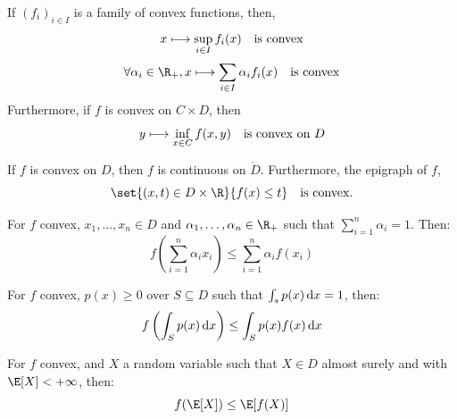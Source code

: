 \documentclass{../cs-classes/cs-classes}
\begin{document}
\begin{property}
    If $(f_i)_{i\in I}$ is a family of convex functions, then,
    \begin{equation*}
        x \longmapsto \sup_{i\in I} f_i(x) \quad\textnormal{is convex}
    \end{equation*}
    \begin{equation*}
        \forall \alpha_i\in\R_+, x \longmapsto \sum_{i\in I} \alpha_i f_i(x) \quad\textnormal{is convex}
    \end{equation*}
    Furthermore, if $f$ is convex on $C\times D$, then
    \begin{equation*}
        y \longmapsto \inf_{x\in C} f(x, y) \quad \textnormal{is convex on $D$}
    \end{equation*}
\end{property}

\begin{property}
    If $f$ is convex on $D$, then $f$ is continuous on $\mathring{D}$. Furthermore, the epigraph of $f$,
    \begin{equation*}
        \set{(x, t)\in D\times\R}{f(x)\leq t} \quad \textnormal{is convex.}
    \end{equation*}
\end{property}

\begin{property}
    For $f$ convex, $x_1, \dots, x_n\in D$ and $\alpha_1,\dots, \alpha_n\in\R_+$ such that $\sum_{i=1}^n\alpha_i=1$. Then:
    \begin{equation*}
        f\left(\sum_{i=1}^n\alpha_ix_i\right) \leq \sum_{i=1}^n\alpha_if(x_i)
    \end{equation*}
\end{property}

\begin{property}
    For $f$ convex, $p(x)\geq0$ over $S\subseteq D$ such that $\int_s p(x)\,\textnormal{d}x=1$, then:
    \begin{equation*}
        f\left(\int_Sp(x)\,\textnormal{d}x\right) \leq \int_Sp(x)f(x)\,\textnormal{d}x
    \end{equation*}
\end{property}

\begin{property}
    For $f$ convex, and $X$ a random variable such that $X\in D$ almost surely and with $\E[X]<+\infty$, then:
    \begin{equation*}
        f(\E[X])\leq\E[f(X)]
    \end{equation*}
\end{property}
\end{document}
